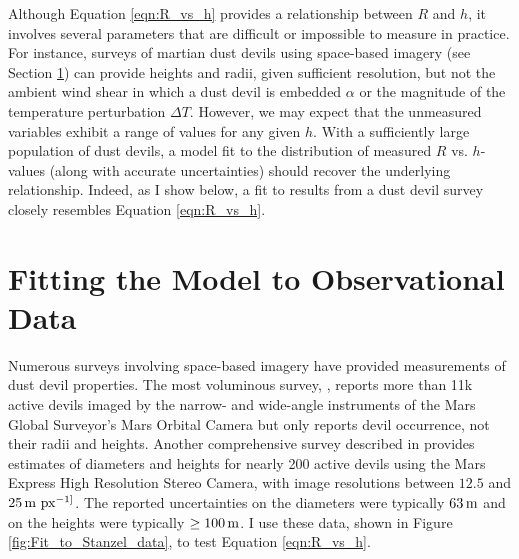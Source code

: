 \documentclass{aastex63}
\begin{document}

Although Equation \ref{eqn:R_vs_h} provides a relationship between $R$ and $h$, it involves several parameters that are difficult or impossible to measure in practice. For instance, surveys of martian dust devils using space-based imagery (see Section \ref{sec:fitting}) can provide heights and radii, given sufficient resolution, but not the ambient wind shear in which a dust devil is embedded $\alpha$ or the magnitude of the temperature perturbation $\Delta T$. However, we may expect that the unmeasured variables exhibit a range of values for any given $h$. With a sufficiently large population of dust devils, a model fit to the distribution of measured $R$ vs. $h$-values (along with accurate uncertainties) should recover the underlying relationship. Indeed, as I show below, a fit to results from a dust devil survey closely resembles Equation \ref{eqn:R_vs_h}.

\section{Fitting the Model to Observational Data}
\label{sec:fitting}
Numerous surveys involving space-based imagery have provided measurements of dust devil properties. The most voluminous survey, \citet{2006JGRE..11112002C}, reports more than 11k active devils imaged by the narrow- and wide-angle instruments of the Mars Global Surveyor's Mars Orbital Camera but only reports devil occurrence, not their radii and heights. Another comprehensive survey described in \citet{2008Icar..197...39S} provides estimates of diameters and heights for nearly 200 active devils using the Mars Express High Resolution Stereo Camera, with image resolutions between $12.5$ and $25\,{\rm m\ px^{-1]}}$. The reported uncertainties on the diameters were typically $63\,{\rm m}$ and on the heights were typically $\ge 100\,{\rm m}$. I use these data, shown in Figure \ref{fig:Fit_to_Stanzel_data}, to test Equation \ref{eqn:R_vs_h}.
\end{document}
